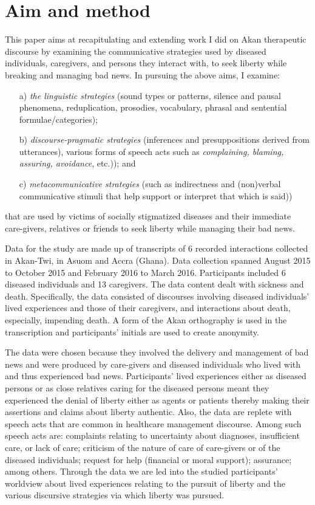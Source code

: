 \documentclass[output=paper,colorlinks,citecolor=brown]{langscibook}
\begin{document}
\section{Aim and method}\label{sec:obeng:3}

This paper aims at recapitulating and extending work I did on Akan therapeutic discourse \citep{Obeng2008} by examining the communicative strategies used by diseased individuals, caregivers, and persons they interact with, to seek liberty while breaking and managing bad news. In pursuing the above aims, I examine:

\begin{enumerate}
     \item[a)] \textit{the linguistic strategies} (sound types or patterns, silence and pausal phenomena, reduplication, prosodies, vocabulary, phrasal and sentential formulae/categories);
     \item[b)] \textit{discourse-pragmatic strategies} (inferences and presuppositions derived from utterances), various forms of speech acts such as \textit{complaining, blaming, assuring, avoidance}, etc.)); and
     \item[c)] \textit{metacommunicative strategies} (such as indirectness and (non)verbal communicative stimuli that help support or interpret that which is said))
\end{enumerate}

that are used by victims of socially stigmatized diseases and their immediate care-givers, relatives or friends to seek liberty while managing their bad news. 

Data for the study are made up of transcripts of 6 recorded interactions collected in Akan-Twi, in Asuom and Accra (Ghana). Data collection spanned August 2015 to October 2015 and February 2016 to March 2016. Participants included 6 diseased individuals and 13 caregivers. The data content dealt with sickness and death. Specifically, the data consisted of discourses involving diseased individuals’ lived experiences and those of their caregivers, and interactions about death, especially, impending death. A form of the Akan orthography is used in the transcription and participants’ initials are used to create anonymity. 

The data were chosen because they involved the delivery and management of bad news and were produced by care-givers and diseased individuals who lived with and thus experienced bad news. Participants’ lived experiences either as diseased persons or as close relatives caring for the diseased persons meant they experienced the denial of liberty either as agents or patients thereby making their assertions and claims about liberty authentic. Also, the data are replete with speech acts that are common in healthcare management discourse. Among such speech acts are: complaints relating to uncertainty about diagnoses, insufficient care, or lack of care; criticism of the nature of care of care-givers or of the diseased individuals; request for help (financial or moral support); assurance; among others. Through the data we are led into the studied participants’ worldview about lived experiences relating to the pursuit of liberty and the various discursive strategies via which liberty was pursued.
\end{document}
